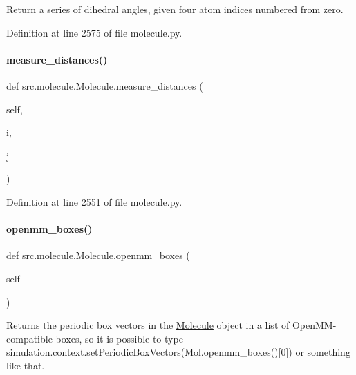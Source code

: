Return a series of dihedral angles, given four atom indices numbered from zero. 



Definition at line 2575 of file molecule.\+py.

\mbox{\label{classsrc_1_1molecule_1_1Molecule_a2a818455c2439cd42f7489d3f811eb72}} 
\paragraph{\texorpdfstring{measure\+\_\+distances()}{measure\_distances()}}
{\footnotesize\ttfamily def src.\+molecule.\+Molecule.\+measure\+\_\+distances (\begin{DoxyParamCaption}\item[{}]{self,  }\item[{}]{i,  }\item[{}]{j }\end{DoxyParamCaption})}



Definition at line 2551 of file molecule.\+py.

\mbox{\label{classsrc_1_1molecule_1_1Molecule_a4afda180689c9bfde319a025f96d4c0b}} 
\paragraph{\texorpdfstring{openmm\+\_\+boxes()}{openmm\_boxes()}}
{\footnotesize\ttfamily def src.\+molecule.\+Molecule.\+openmm\+\_\+boxes (\begin{DoxyParamCaption}\item[{}]{self }\end{DoxyParamCaption})}



Returns the periodic box vectors in the \hyperlink{classsrc_1_1molecule_1_1Molecule}{Molecule} object in a list of Open\+M\+M-\/compatible boxes, so it is possible to type simulation.\+context.\+set\+Periodic\+Box\+Vectors(Mol.\+openmm\+\_\+boxes()\mbox{[}0\mbox{]}) or something like that. 



